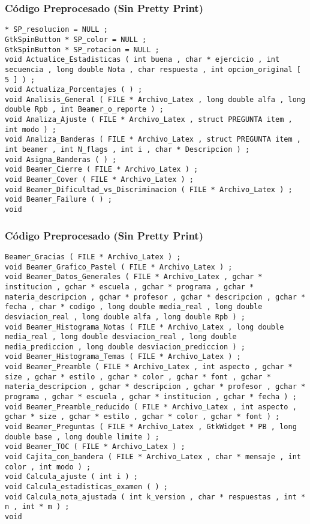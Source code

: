 \documentclass{beamer}
\begin{document}
\begin{frame}[fragile]
\frametitle{C\'odigo Preprocesado (Sin Pretty Print)}
\begin{lstlisting}[style=CStyle]
* SP_resolucion = NULL ; 
GtkSpinButton * SP_color = NULL ; 
GtkSpinButton * SP_rotacion = NULL ; 
void Actualice_Estadisticas ( int buena , char * ejercicio , int secuencia , long double Nota , char respuesta , int opcion_original [ 5 ] ) ; 
void Actualiza_Porcentajes ( ) ; 
void Analisis_General ( FILE * Archivo_Latex , long double alfa , long double Rpb , int Beamer_o_reporte ) ; 
void Analiza_Ajuste ( FILE * Archivo_Latex , struct PREGUNTA item , int modo ) ; 
void Analiza_Banderas ( FILE * Archivo_Latex , struct PREGUNTA item , int beamer , int N_flags , int i , char * Descripcion ) ; 
void Asigna_Banderas ( ) ; 
void Beamer_Cierre ( FILE * Archivo_Latex ) ; 
void Beamer_Cover ( FILE * Archivo_Latex ) ; 
void Beamer_Dificultad_vs_Discriminacion ( FILE * Archivo_Latex ) ; 
void Beamer_Failure ( ) ; 
void \end{lstlisting}
\end{frame}
\begin{frame}[fragile]
\frametitle{C\'odigo Preprocesado (Sin Pretty Print)}
\begin{lstlisting}[style=CStyle]
Beamer_Gracias ( FILE * Archivo_Latex ) ; 
void Beamer_Grafico_Pastel ( FILE * Archivo_Latex ) ; 
void Beamer_Datos_Generales ( FILE * Archivo_Latex , gchar * institucion , gchar * escuela , gchar * programa , gchar * materia_descripcion , gchar * profesor , gchar * descripcion , gchar * fecha , char * codigo , long double media_real , long double desviacion_real , long double alfa , long double Rpb ) ; 
void Beamer_Histograma_Notas ( FILE * Archivo_Latex , long double media_real , long double desviacion_real , long double media_prediccion , long double desviacion_prediccion ) ; 
void Beamer_Histograma_Temas ( FILE * Archivo_Latex ) ; 
void Beamer_Preamble ( FILE * Archivo_Latex , int aspecto , gchar * size , gchar * estilo , gchar * color , gchar * font , gchar * materia_descripcion , gchar * descripcion , gchar * profesor , gchar * programa , gchar * escuela , gchar * institucion , gchar * fecha ) ; 
void Beamer_Preamble_reducido ( FILE * Archivo_Latex , int aspecto , gchar * size , gchar * estilo , gchar * color , gchar * font ) ; 
void Beamer_Preguntas ( FILE * Archivo_Latex , GtkWidget * PB , long double base , long double limite ) ; 
void Beamer_TOC ( FILE * Archivo_Latex ) ; 
void Cajita_con_bandera ( FILE * Archivo_Latex , char * mensaje , int color , int modo ) ; 
void Calcula_ajuste ( int i ) ; 
void Calcula_estadisticas_examen ( ) ; 
void Calcula_nota_ajustada ( int k_version , char * respuestas , int * n , int * m ) ; 
void \end{lstlisting}
\end{frame}
\end{document}
